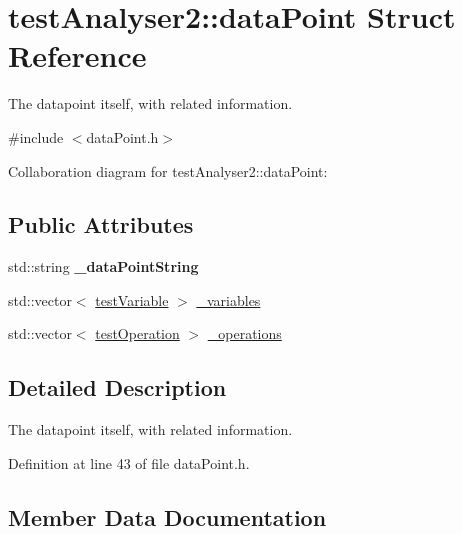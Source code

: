 \hypertarget{structtestAnalyser2_1_1dataPoint}{}\section{test\+Analyser2\+::data\+Point Struct Reference}
\label{structtestAnalyser2_1_1dataPoint}


The datapoint itself, with related information.  




{\ttfamily \#include $<$data\+Point.\+h$>$}



Collaboration diagram for test\+Analyser2\+::data\+Point\+:
\subsection*{Public Attributes}
\begin{DoxyCompactItemize}
\item 
\mbox{\label{structtestAnalyser2_1_1dataPoint_a58ac5a1113e60c7436f70cae63753152}} 
std\+::string {\bfseries \+\_\+data\+Point\+String}
\item 
std\+::vector$<$ \mbox{\hyperlink{structtestAnalyser2_1_1testVariable}{test\+Variable}} $>$ \mbox{\hyperlink{structtestAnalyser2_1_1dataPoint_a4ca3ec50ceed09866220f0d18f5a822e}{\+\_\+variables}}
\item 
std\+::vector$<$ \mbox{\hyperlink{structtestAnalyser2_1_1testOperation}{test\+Operation}} $>$ \mbox{\hyperlink{structtestAnalyser2_1_1dataPoint_a50c944d063652cbc1222f1ec6ed75101}{\+\_\+operations}}
\end{DoxyCompactItemize}


\subsection{Detailed Description}
The datapoint itself, with related information. 

Definition at line 43 of file data\+Point.\+h.



\subsection{Member Data Documentation}
\mbox{\label{structtestAnalyser2_1_1dataPoint_a50c944d063652cbc1222f1ec6ed75101}} 
